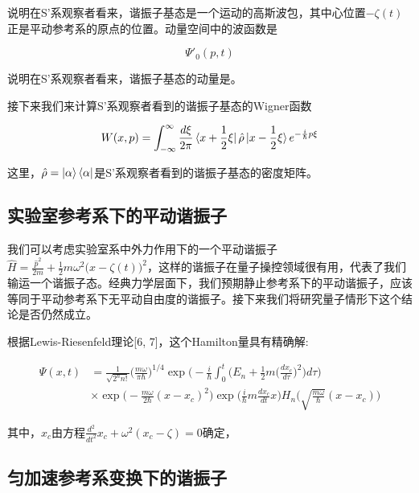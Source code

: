 \documentclass[a4paper]{article}
\begin{document}
        说明在S'系观察者看来，谐振子基态是一个运动的高斯波包，其中心位置$-\zeta(t)$正是平动参考系的原点的位置。动量空间中的波函数是

        \begin{equation}
            \Psi'_0(p,t)
        \end{equation}

        说明在S'系观察者看来，谐振子基态的动量是。

        接下来我们来计算S'系观察者看到的谐振子基态的Wigner函数

        \begin{equation}
            W(x, p) = \int_{-\infty}^\infty \frac{d\xi}{2\pi}\bra{x+\frac{1}{2}\xi}\hat{\rho}\ket{x-\frac{1}{2}\xi} e^{-\frac{i}{\hbar}p\xi}
        \end{equation}

        这里，$\hat{\rho}=\ket{\alpha}\bra{\alpha}$是S'系观察者看到的谐振子基态的密度矩阵。

    \subsection{实验室参考系下的平动谐振子}
        我们可以考虑实验室系中外力作用下的一个平动谐振子$\hat{H}=\frac{\hat{p}^2}{2m}+\frac{1}{2}m\omega^2\big(\hat{x}-\zeta(t)\big)^2$，这样的谐振子在量子操控领域很有用，代表了我们输运一个谐振子态。经典力学层面下，我们预期静止参考系下的平动谐振子，应该等同于平动参考系下无平动自由度的谐振子。接下来我们将研究量子情形下这个结论是否仍然成立。

        根据Lewis-Riesenfeld理论[6, 7]，这个Hamilton量具有精确解:

        \begin{equation}
            \begin{split}  
                \Psi(x,t)& =\frac{1}{\sqrt{2^n n!}}\bigg(\frac{m\omega}{\pi\hbar}\bigg)^{1/4} \exp\bigg(-\frac{i}{\hbar}\int_0^t \bigg(E_n+\frac{1}{2}m\big(\frac{dx_c}{d\tau}\big)^2\bigg)d\tau\bigg) \\
                    & \times\exp\bigg(-\frac{m\omega}{2\hbar}(x-x_c)^2\bigg) \exp\bigg(\frac{i}{\hbar}m\frac{dx_c}{dt}x\bigg) H_n\bigg(\sqrt{\frac{m\omega}{\hbar}}(x-x_c)\bigg)
            \end{split}
        \end{equation}
    
        其中，$x_c$由方程$\frac{d^2}{dt^2}x_c+\omega^2(x_c-\zeta)=0$确定，

    \subsection{匀加速参考系变换下的谐振子}
\end{document}
